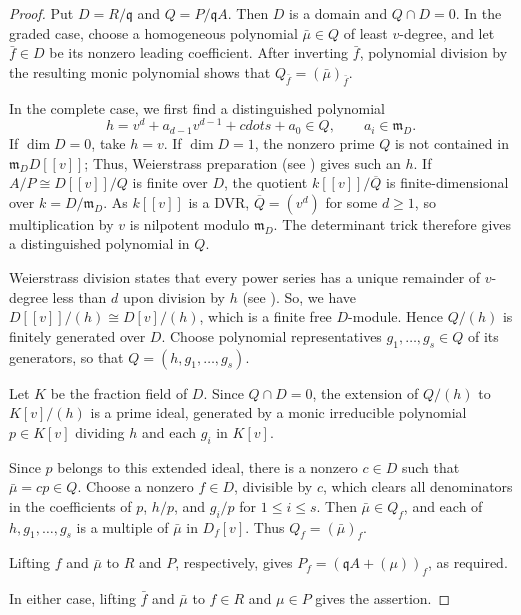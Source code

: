 \documentclass[11pt,letterpaper]{amsart}
\theoremstyle{plain}
\theoremstyle{definition}
\theoremstyle{remark}
\begin{document}
\begin{proof}
Put $D=R/\mathfrak q$ and $Q=P/\mathfrak qA$.
Then $D$ is a domain and $Q\cap D=0$.
In the graded case, choose a homogeneous polynomial
$\bar\mu\in Q$ of least $v$-degree, and let $\bar f\in D$
be its nonzero leading coefficient. After inverting
$\bar f$, polynomial division by the resulting monic
polynomial shows that $Q_{\bar f}=(\bar\mu)_{\bar f}$.

In the complete case, we first find a distinguished polynomial \[ h=v^d+a_{d-1}v^{d-1}+ cdots+a_0\in Q, \qquad a_i\in\mathfrak m_D. \] If $\dim D=0$, take $h=v$. If $\dim D=1$, the nonzero prime $Q$ is not contained in $\mathfrak m_DD[[v]]$; Thus, Weierstrass preparation (see \cite[Chapter~9,  Section~9, Theorem~9.2]{lang2012algebra}) gives such an $h$. If $A/P\cong D[[v]]/Q$ is finite over $D$, the quotient $k[[v]]/\overline Q$ is finite-dimensional over $k=D/\mathfrak m_D$. As $k[[v]]$ is a DVR, $\overline Q=(v^d)$ for some $d\geq1$, so multiplication by $v$ is nilpotent modulo $\mathfrak m_D$. The determinant trick therefore gives a distinguished polynomial in $Q$.


Weierstrass division states that every power series
has a unique remainder of $v$-degree less than $d$
upon division by $h$ (see \cite[Chapter~9, Section~9,Theorem~9.1]{lang2012algebra}). 
So, we have $D[[v]]/(h)\cong D[v]/(h)$, which is a finite free $D$-module. Hence $Q/(h)$ is finitely generated over $D$. Choose polynomial representatives $g_1,\ldots,g_s\in Q$ of its generators, so that $Q=(h,g_1,\ldots,g_s)$. 

Let $K$ be the fraction field of $D$. Since $Q\cap D=0$, the extension of $Q/(h)$ to $K[v]/(h)$ is a prime ideal, generated by a monic irreducible polynomial $p\in K[v]$ dividing $h$ and each $g_i$ in $K[v]$.

Since $p$ belongs to this extended ideal, there is a nonzero $c\in D$ such that $\bar\mu=cp\in Q$. Choose a nonzero $f\in D$, divisible by $c$, which clears all denominators in the coefficients of $p$, $h/p$, and $g_i/p$ for $1\leq i\leq s$. Then $\bar\mu\in Q_f$, and each of $h,g_1,\ldots,g_s$ is a multiple of $\bar\mu$ in $D_f[v]$. Thus $Q_f=(\bar\mu)_f$. 

Lifting $f$ and $\bar\mu$ to $R$ and $P$, respectively, gives $P_f=(\mathfrak qA+(\mu))_f$, as required.


In either case, lifting $\bar f$ and $\bar\mu$ to
$f\in R$ and $\mu\in P$ gives the assertion.
\end{proof}
\end{document}
